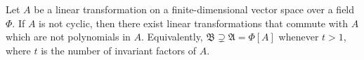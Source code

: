 Let $A$ be a linear transformation on a finite-dimensional vector space over a field $\Phi$. If $A$ is not cyclic, then there exist linear transformations that commute with $A$ which are not polynomials in $A$. Equivalently, $\mathfrak{B} \supsetneq \mathfrak{A} = \Phi[A]$ whenever $t > 1$, where $t$ is the number of invariant factors of $A$.

